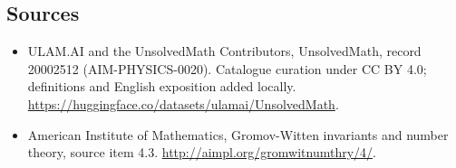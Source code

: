 \documentclass[11pt]{article}
\begin{document}
\subsection{Sources}
\begin{itemize}
\item[\hypertarget{source:20002512:1}{S1}] ULAM.AI and the UnsolvedMath Contributors, UnsolvedMath, record 20002512 (AIM-PHYSICS-0020). Catalogue curation under CC BY 4.0; definitions and English exposition added locally.
\url{https://huggingface.co/datasets/ulamai/UnsolvedMath}.
\item[\hypertarget{source:20002512:2}{S2}] American Institute of Mathematics, Gromov-Witten invariants and number theory, source item 4.3.
\url{http://aimpl.org/gromwitnumthry/4/}.
\end{itemize}
\label{end:20002512}
\end{document}
